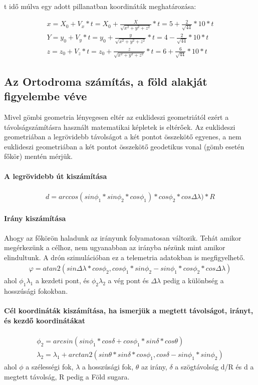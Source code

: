 t idő múlva egy adott pillanatban koordináták meghatározása:

\begin{gather}
    x = X_0 + V_x * t = X_0 + \frac{X}{\sqrt{x^2 + y^2 + z^2}} * t = 5 + \frac{2}{\sqrt{44}} * 10 * t \\
    Y = y_0 + V_y * t = y_0 + \frac{y}{\sqrt{x^2 + y^2 + z^2}} * t = 4 - \frac{2}{\sqrt{44}} * 10 * t \\
    z = z_0 + V_z * t = z_0 + \frac{z}{\sqrt{x^2 + y^2 + z^2}} * t = 6 + \frac{6}{\sqrt{44}} * 10 * t
\end{gather}

\subsection{Az Ortodroma számítás, a föld alakját figyelembe véve}

Mivel gömbi geometria lényegesen eltér az euklideszi geometriától ezért a távolságszámításra használt matematikai képletek is eltérőek.
Az euklideszi geometriában a legrövidebb távolságot a két pontot összekötő egyenes,
a nem euklideszi geometriában a két pontot összekötő geodetikus vonal (gömb esetén főkör) mentén mérjük.

\paragraph{A legrövidebb út kiszámítása}
\begin{gather}
    d = arccos(sin\phi_1 * sin\phi_2 * cos\phi_1)* cos\phi_2 * cos\Delta \lambda) * R
\end{gather}

\paragraph{Irány kiszámítása}
Ahogy az főkörön haladunk az irányunk folyamatosan változik. Tehát amikor megérkezünk a célhoz, nem ugyanabban az irányba nézünk mint amikor elindultunk.
A drón szimulációban ez a telemetria adatokban is megfigyelhető.
\begin{gather*}
    \varphi = atan2(sin\Delta\lambda * cos\phi_{2}, cos\phi_{1} * sin\phi_{2} - sin\phi_{1} * cos\phi_{2} * cos\Delta\lambda)
\end{gather*}
ahol $\phi_{1}\lambda_{1}$ a kezdeti pont, és $\phi_{2}\lambda_{2}$ a vég pont és $\Delta\lambda$ pedig a különbség a hosszúsági fokokban.

\paragraph{Cél koordináták kiszámítása, ha ismerjük a megtett távolságot, irányt, és kezdő koordinátákat}
\begin{gather}
    \phi_{2} = arcsin(sin \phi_{1} * cos \delta + cos \phi_{1} * sin \delta * cos \theta)\\
    \lambda_{2} = \lambda_{1} + arctan2(sin\theta * sin\delta  * cos\phi_{1}, cos\delta - sin\phi_{1} * sin\phi_{2})
\end{gather}
ahol $\phi$ a szélességi fok, $\lambda$ a hosszúsági fok, $\theta$ az irány, $\delta$ a szögtávolság d/R és d a megtett távolság, R pedig a Föld sugara.

